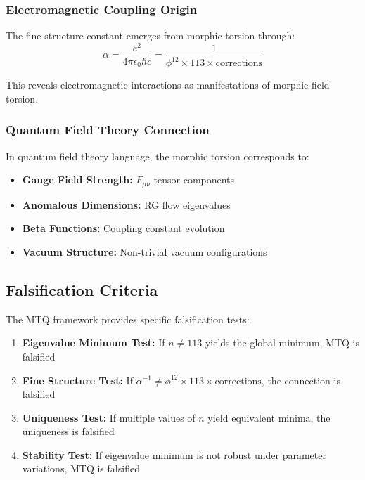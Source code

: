 \subsubsection{Electromagnetic Coupling Origin}

The fine structure constant emerges from morphic torsion through:
\begin{equation}
\alpha = \frac{e^2}{4\pi\epsilon_0\hbar c} = \frac{1}{\phi^{12} \times 113 \times \text{corrections}}
\end{equation}

This reveals electromagnetic interactions as manifestations of morphic field torsion.

\subsubsection{Quantum Field Theory Connection}

In quantum field theory language, the morphic torsion corresponds to:
\begin{itemize}
\item \textbf{Gauge Field Strength:} $F_{\mu\nu}$ tensor components
\item \textbf{Anomalous Dimensions:} RG flow eigenvalues
\item \textbf{Beta Functions:} Coupling constant evolution
\item \textbf{Vacuum Structure:} Non-trivial vacuum configurations
\end{itemize}

\subsection{Falsification Criteria}

The MTQ framework provides specific falsification tests:

\begin{enumerate}
\item \textbf{Eigenvalue Minimum Test:} If $n \neq 113$ yields the global minimum, MTQ is falsified
\item \textbf{Fine Structure Test:} If $\alpha^{-1} \neq \phi^{12} \times 113 \times \text{corrections}$, the connection is falsified
\item \textbf{Uniqueness Test:} If multiple values of $n$ yield equivalent minima, the uniqueness is falsified
\item \textbf{Stability Test:} If eigenvalue minimum is not robust under parameter variations, MTQ is falsified
\end{enumerate}

